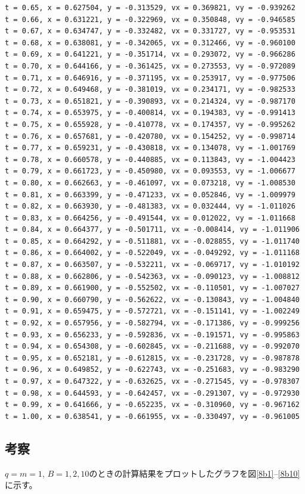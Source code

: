 \documentclass[a4j,titlepage]{jsarticle}
\begin{document}
\begin{lstlisting}[style=text,caption=課題9の実行結果,label=lst:kekka9]
t = 0.65, x = 0.627504, y = -0.313529, vx = 0.369821, vy = -0.939262
t = 0.66, x = 0.631221, y = -0.322969, vx = 0.350848, vy = -0.946585
t = 0.67, x = 0.634747, y = -0.332482, vx = 0.331727, vy = -0.953531
t = 0.68, x = 0.638081, y = -0.342065, vx = 0.312466, vy = -0.960100
t = 0.69, x = 0.641221, y = -0.351714, vx = 0.293072, vy = -0.966286
t = 0.70, x = 0.644166, y = -0.361425, vx = 0.273553, vy = -0.972089
t = 0.71, x = 0.646916, y = -0.371195, vx = 0.253917, vy = -0.977506
t = 0.72, x = 0.649468, y = -0.381019, vx = 0.234171, vy = -0.982533
t = 0.73, x = 0.651821, y = -0.390893, vx = 0.214324, vy = -0.987170
t = 0.74, x = 0.653975, y = -0.400814, vx = 0.194383, vy = -0.991413
t = 0.75, x = 0.655928, y = -0.410778, vx = 0.174357, vy = -0.995262
t = 0.76, x = 0.657681, y = -0.420780, vx = 0.154252, vy = -0.998714
t = 0.77, x = 0.659231, y = -0.430818, vx = 0.134078, vy = -1.001769
t = 0.78, x = 0.660578, y = -0.440885, vx = 0.113843, vy = -1.004423
t = 0.79, x = 0.661723, y = -0.450980, vx = 0.093553, vy = -1.006677
t = 0.80, x = 0.662663, y = -0.461097, vx = 0.073218, vy = -1.008530
t = 0.81, x = 0.663399, y = -0.471233, vx = 0.052846, vy = -1.009979
t = 0.82, x = 0.663930, y = -0.481383, vx = 0.032444, vy = -1.011026
t = 0.83, x = 0.664256, y = -0.491544, vx = 0.012022, vy = -1.011668
t = 0.84, x = 0.664377, y = -0.501711, vx = -0.008414, vy = -1.011906
t = 0.85, x = 0.664292, y = -0.511881, vx = -0.028855, vy = -1.011740
t = 0.86, x = 0.664002, y = -0.522049, vx = -0.049292, vy = -1.011168
t = 0.87, x = 0.663507, y = -0.532211, vx = -0.069717, vy = -1.010192
t = 0.88, x = 0.662806, y = -0.542363, vx = -0.090123, vy = -1.008812
t = 0.89, x = 0.661900, y = -0.552502, vx = -0.110501, vy = -1.007027
t = 0.90, x = 0.660790, y = -0.562622, vx = -0.130843, vy = -1.004840
t = 0.91, x = 0.659475, y = -0.572721, vx = -0.151141, vy = -1.002249
t = 0.92, x = 0.657956, y = -0.582794, vx = -0.171386, vy = -0.999256
t = 0.93, x = 0.656233, y = -0.592836, vx = -0.191571, vy = -0.995863
t = 0.94, x = 0.654308, y = -0.602845, vx = -0.211688, vy = -0.992070
t = 0.95, x = 0.652181, y = -0.612815, vx = -0.231728, vy = -0.987878
t = 0.96, x = 0.649852, y = -0.622743, vx = -0.251683, vy = -0.983290
t = 0.97, x = 0.647322, y = -0.632625, vx = -0.271545, vy = -0.978307
t = 0.98, x = 0.644593, y = -0.642457, vx = -0.291307, vy = -0.972930
t = 0.99, x = 0.641666, y = -0.652235, vx = -0.310960, vy = -0.967162
t = 1.00, x = 0.638541, y = -0.661955, vx = -0.330497, vy = -0.961005
\end{lstlisting}

\subsection{考察}
$q=m=1$, $B=1, 2, 10$のときの計算結果をプロットしたグラフを図\ref{8b1}--\ref{8b10}に示す。
\end{document}
